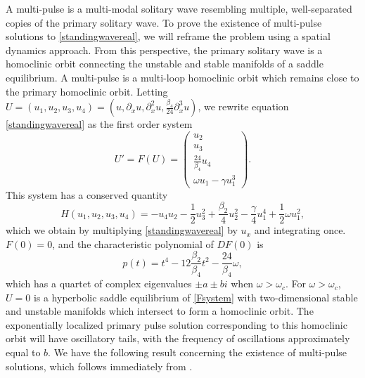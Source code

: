 \documentclass[12pt]{elsarticle}
\begin{document}
A multi-pulse is a multi-modal solitary wave resembling multiple, well-separated copies of the primary solitary wave. To prove the existence of multi-pulse solutions to \cref{standingwavereal}, we will reframe the problem using a spatial dynamics approach. From this perspective, the primary solitary wave is a homoclinic orbit connecting the unstable and stable manifolds of a saddle equilibrium. A multi-pulse is a multi-loop homoclinic orbit which remains close to the primary homoclinic orbit. Letting $U = (u_1, u_2, u_3, u_4) = (u, \partial_x u, \partial_x^2 u, \frac{\beta_4}{24} \partial_x^3 u)$, we rewrite equation \cref{standingwavereal} as the first order system
\begin{equation}\label{Fsystem}
U' = F(U) = \begin{pmatrix}
u_2 \\ u_3 \\ \frac{24}{\beta_4} u_4 \\ \omega u_1 - \gamma u_1^3
\end{pmatrix}.
\end{equation}
This system has a conserved quantity
\begin{equation}\label{FsystemH}
H(u_1, u_2, u_3, u_4) = -u_4 u_2 - \frac{1}{2} u_3^2 + \frac{\beta_2}{4}u_2^2 - \frac{\gamma}{4} u_1^4 + \frac{1}{2}\omega u_1^2,
\end{equation}
which we obtain by multiplying \cref{standingwavereal} by $u_x$ and integrating once. $F(0) = 0$, and the characteristic polynomial of $DF(0)$ is
\[
p(t) = t^4 - 12\frac{\beta_2}{\beta_4} t^2 - \frac{24}{\beta_4}\omega,
\]
which has a quartet of complex eigenvalues $\pm a \pm b i$ when $\omega > \omega_c$. For $\omega > \omega_c$, $U = 0$ is a hyperbolic saddle equilibrium of \cref{Fsystem} with two-dimensional stable and unstable manifolds which intersect to form a homoclinic orbit. The exponentially localized primary pulse solution corresponding to this homoclinic orbit will have oscillatory tails, with the frequency of oscillations approximately equal to $b$. We have the following result concerning the existence of multi-pulse solutions, which follows immediately from \cite[Theorem~3.6]{SandstedeStrut}. 
\end{document}
